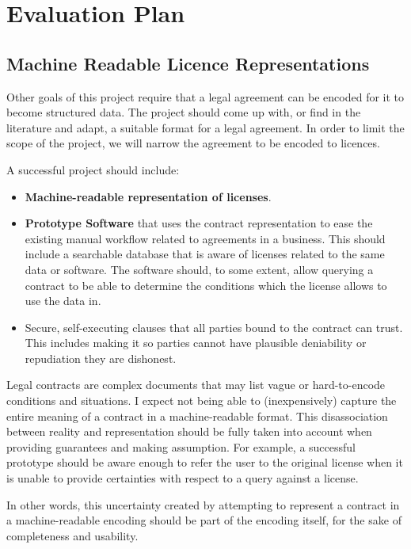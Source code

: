 
\chapter{Evaluation Plan}\label{ch:evaluation}

\section{Machine Readable Licence Representations}



Other goals of this project require that a legal agreement can be encoded for it to become
structured data.
The project should come up with, or find in the literature and adapt, a suitable format for a legal
agreement.
In order to limit the scope of the project, we will narrow the agreement to be encoded to licences.

A successful project should include:
\begin{itemize}
    \item \textbf{Machine-readable representation of licenses}.
    \item \textbf{Prototype Software} that uses the contract representation to ease the existing
    manual workflow related to agreements in a business.
    This should include a searchable database that is aware of licenses related to the same data or
    software.
    The software should, to some extent, allow querying a contract to be able to determine the
    conditions which the license allows to use the data in.
    \item Secure, self-executing clauses that all parties bound to the contract can trust. This
    includes making it so parties cannot have plausible deniability or repudiation they are
    dishonest.
\end{itemize}

Legal contracts are complex documents that may list vague or hard-to-encode conditions and situations.
I expect not being able to (inexpensively) capture the entire meaning of a contract in a
machine-readable format.
This disassociation between reality and representation should be fully
taken into account when providing guarantees and making assumption.
For example, a successful prototype should be aware enough to refer the user to the original license
when it is unable to provide certainties with respect to a query against a license.

In other words, this uncertainty created by attempting to represent a contract in a machine-readable
encoding should be part of the encoding itself, for the sake of completeness and usability.




